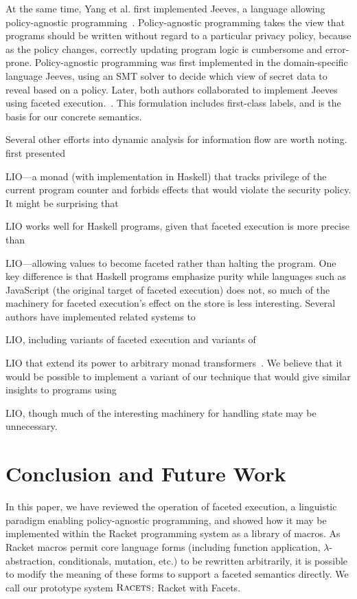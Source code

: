 \documentclass[review=true,acmlarge]{acmart}
\newcommand*{\SavedLstInline}{}
\DeclareRobustCommand*{\lstinline}{%
  \ifmmode
    \let\SavedBGroup\bgroup
    \def\bgroup{%
      \let\bgroup\SavedBGroup
      \hbox\bgroup
    }%
  \fi
  \SavedLstInline
}
\newcommand{\code}[1]{\lstinline{#1}}
\newcommand{\racets}[0]{$\textsc{Racets}$\xspace}
\begin{document}
At the same time, Yang et al. first implemented Jeeves, a language
allowing policy-agnostic programming~\cite{Yang:2012}. Policy-agnostic
programming takes the view that programs should be written without
regard to a particular privacy policy, because as the policy changes,
correctly updating program logic is cumbersome and
error-prone. Policy-agnostic programming was first implemented in the
domain-specific language Jeeves, using an SMT solver to decide which
view of secret data to reveal based on a policy. Later, both authors
collaborated to implement Jeeves using faceted
execution.~\cite{Austin:2013}. This formulation includes first-class
labels, and is the basis for our concrete semantics.

Several other efforts into dynamic analysis for information flow are
worth noting. \citet{Stefan:2011} first presented \code{LIO}---a monad
(with implementation in Haskell) that tracks privilege of the current
program counter and forbids effects that would violate the security
policy. It might be surprising that \code{LIO}
works well for Haskell programs, given that faceted execution is
more precise than \code{LIO}---allowing values to become faceted
rather than halting the program. One key difference is that Haskell
programs emphasize purity while languages such as
JavaScript (the original target of faceted execution) does not, so much
of the machinery for faceted execution's effect on the store is less
interesting. Several authors have implemented related systems to
\code{LIO}, including variants of faceted execution \cite{Schmitz:2016}
and variants of \code{LIO} that extend its
power to arbitrary monad transformers~\cite{james}. We believe that it
would be possible to implement a variant of our technique that would
give similar insights to programs using \code{LIO}, though much of the
interesting machinery for handling state may be unnecessary.

\section{Conclusion and Future Work}
\label{sec:conclusion}

In this paper, we have reviewed the operation of faceted execution, a linguistic paradigm
enabling policy-agnostic programming, and showed how it may be implemented within
the Racket programming system as a library of macros. As Racket macros permit core language
forms (including function application, $\lambda$-abstraction, conditionals, mutation, etc.)
to be rewritten arbitrarily, it is possible to modify the meaning of these forms to support
a faceted semantics directly. We call our prototype system \racets: Racket with Facets.
\end{document}
